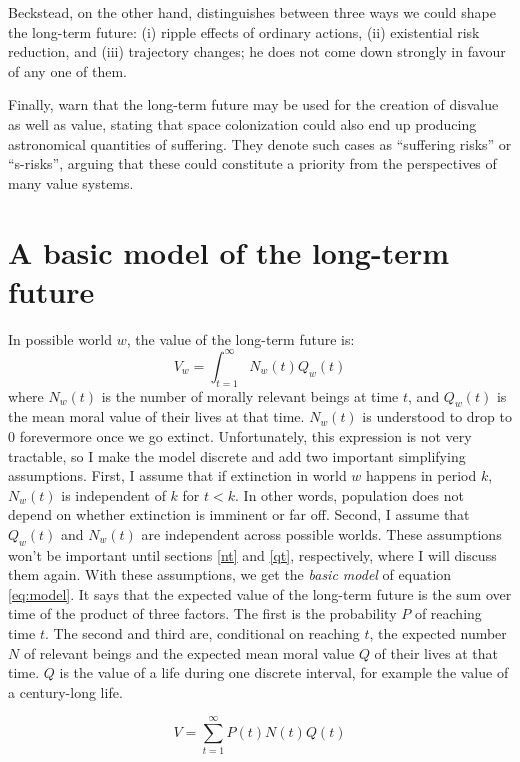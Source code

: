 \documentclass[british]{article}
\begin{document}
Beckstead, on the other hand, distinguishes between three ways we could shape the long-term future: (i)
ripple effects of ordinary actions, (ii) existential risk reduction, and
(iii) trajectory changes; he does not come down strongly in favour of any one of them.

Finally, \cite{althaus_reducing_2016} warn that the long-term future may be used for the creation of disvalue as well as value, stating that space colonization could also end up producing astronomical quantities of suffering. They denote such cases as ``suffering risks'' or ``s-risks'', arguing that these could constitute a priority from the perspectives of many value systems.

\section{A basic model of the long-term future}\label{sec:basicmodel}
In possible world $w$, the value of the long-term future is:
$$V_w = \int_{t=1}^\infty N_w(t)Q_w(t)$$
where $N_w(t)$ is the number of morally relevant beings at time $t$, and $Q_w(t)$ is the mean moral value of their lives at that time. $N_w(t)$ is understood to drop to 0 forevermore once we go extinct. Unfortunately, this expression is not very tractable, so I make the model discrete and add two important simplifying assumptions. First, I assume that if extinction in world $w$ happens in period $k$, $N_w(t)$ is independent of $k$ for $t<k$. In other words, population does not depend on whether extinction is imminent or far off. Second, I assume that $Q_w(t)$ and $N_w(t)$ are independent across possible worlds. These assumptions won't be important until sections \ref{nt} and \ref{qt}, respectively, where I will discuss them again. With these assumptions, we get the \emph{basic model} of equation \ref{eq:model}. It says that the expected value of the long-term future is the sum over time of the product of three factors. The first is the probability $P$ of reaching time \(t\). The second and third are, conditional on reaching $t$, the expected number $N$ of relevant beings and the expected mean moral value $Q$ of their lives at that time. $Q$ is the value of a life during one discrete interval, for example the value of a century-long life.

\begin{equation}
V=\sum_{t=1}^\infty P(t) N(t)Q(t) \label{eq:model}
\end{equation}
\end{document}
